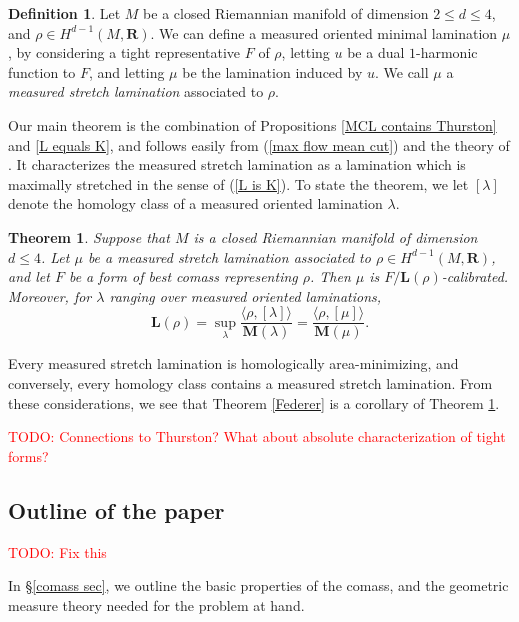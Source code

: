 \documentclass[reqno,11pt]{amsart}
\newcommand{\RR}{\mathbf{R}}
\newcommand{\Mass}{\mathbf M}
\newcommand{\Comass}{\mathbf L}
\newcommand{\dfn}[1]{\emph{#1}\index{#1}}
\newtheorem{mainthm}{Theorem}
\theoremstyle{definition}
\newtheorem{definition}[theorem]{Definition}
\numberwithin{equation}{section}
\newcommand\todo[1]{\textcolor{red}{TODO: #1}}
\begin{document}
\begin{definition}
Let $M$ be a closed Riemannian manifold of dimension $2 \leq d \leq 4$, and $\rho \in H^{d - 1}(M, \RR)$.
We can define a measured oriented minimal lamination $\mu$, by considering a tight representative $F$ of $\rho$, letting $u$ be a dual $1$-harmonic function to $F$, and letting $\mu$ be the lamination induced by $u$.
We call $\mu$ a \dfn{measured stretch lamination} associated to $\rho$.
\end{definition}

Our main theorem is the combination of Propositions \ref{MCL contains Thurston} and \ref{L equals K}, and follows easily from (\ref{max flow mean cut}) and the theory of \cite{BackusFLG, BackusCML}.
It characterizes the measured stretch lamination as a lamination which is maximally stretched in the sense of (\ref{L is K}).
To state the theorem, we let $[\lambda]$ denote the homology class of a measured oriented lamination $\lambda$.

\begin{mainthm}\label{lams are calibrated}
Suppose that $M$ is a closed Riemannian manifold of dimension $d \leq 4$.
Let $\mu$ be a measured stretch lamination associated to $\rho \in H^{d - 1}(M, \RR)$, and let $F$ be a form of best comass representing $\rho$.
Then $\mu$ is $F/\Comass(\rho)$-calibrated.
Moreover, for $\lambda$ ranging over measured oriented laminations,
\begin{equation}\label{duality between stable and comass}
\Comass(\rho) = \sup_\lambda \frac{\langle \rho, [\lambda]\rangle}{\Mass(\lambda)} = \frac{\langle \rho, [\mu]\rangle}{\Mass(\mu)}.
\end{equation}
\end{mainthm}

Every measured stretch lamination is homologically area-minimizing, and conversely, every homology class contains a measured stretch lamination.
From these considerations, we see that Theorem \ref{Federer} is a corollary of Theorem \ref{lams are calibrated}.

\todo{Connections to Thurston? What about absolute characterization of tight forms?}


\subsection{Outline of the paper}
\todo{Fix this}

In \S\ref{comass sec}, we outline the basic properties of the comass, and the geometric measure theory needed for the problem at hand.
\end{document}

